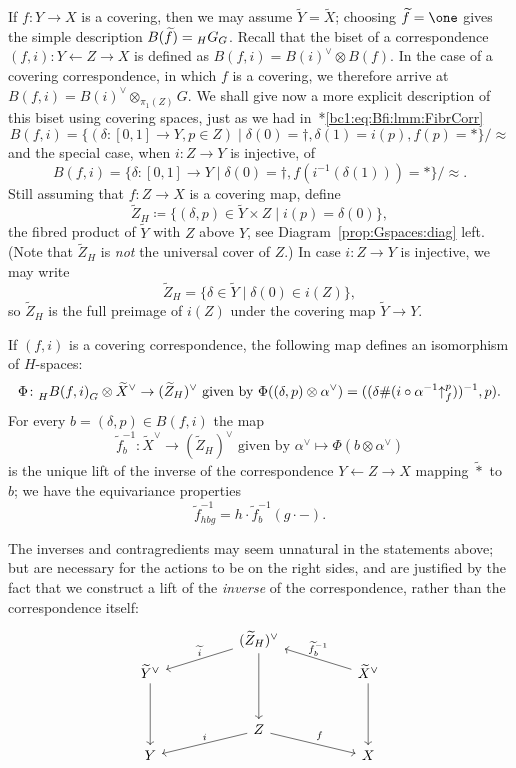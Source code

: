\documentclass{amsart}
\newcommand\wtf{{\widetilde f}}
\begin{document}
If $f\colon Y\to X$ is a covering, then we may assume
$\widetilde Y=\widetilde X$; choosing $\wtf=\one$ gives the
simple description $B(\wtf)=\subscript H G_G$. Recall that the
biset of a correspondence $(f,i)\colon Y\leftarrow Z\to X$ is defined
as $B(f,i)=B(i)^\vee\otimes B(f)$. In the case of a covering
correspondence, in which $f$ is a covering, we therefore arrive at
$B(f,i)=B(i)^\vee\otimes_{\pi_1(Z)}G$. We shall give now a more
explicit description of this biset using covering spaces, just as we
had in~\cite{bartholdi-dudko:bc1}*{\eqref{bc1:eq:Bfi:lmm:FibrCorr}}
\[B(f,i)=\{(\delta\colon[0,1]\to Y,p\in Z)\mid\delta(0)=\dagger,\delta(1)=i(p),f(p)=*\}/{\approx}\]
and the special case, when $i\colon Z\to Y$ is injective, of
\[B(f,i)=\{\delta\colon[0,1]\to Y\mid\delta(0)=\dagger,f(i^{-1}(\delta(1)))=*\}/{\approx}.\]
Still assuming that $f\colon Z\to X$ is a covering map, define
\begin{equation}\label{eq:ZH}
  \widetilde Z_H\coloneqq\{(\delta,p)\in\widetilde Y\times Z\mid i(p)=\delta(0)\},
\end{equation}
the fibred product of $\widetilde Y$ with $Z$ above $Y$, see
Diagram~\eqref{prop:Gspaces:diag} left. (Note that $\widetilde Z_H$ is
\emph{not} the universal cover of $Z$.) In case $i\colon Z\to Y$ is
injective, we may write
\[\widetilde Z_H=\{\delta\in\widetilde Y\mid\delta(0)\in i(Z)\},
\]
so $\widetilde Z_H$ is the full preimage of $i(Z)$ under the
covering map $\widetilde Y\to Y$.
\begin{prop}\label{prop:Gspaces}
  If $(f,i)$ is a covering correspondence, the following map defines
  an isomorphism of $H$-spaces:
  \[\Phi\colon\subscript H{B(f,i)}_G \otimes \widetilde X^\vee\to(\widetilde Z_H)^\vee\text{ given by }\Phi((\delta,p)\otimes\alpha^\vee)=((\delta\#(i\circ\alpha^{-1}\lift f p))^{-1},p).\]
  For every $b=(\delta,p)\in B(f,i)$ the map
  \[\wtf^{-1}_b\colon \widetilde X^\vee\to(\widetilde Z_H)^\vee\text{ given by }\alpha^\vee\mapsto\Phi(b\otimes\alpha^\vee)
  \]
  is the unique lift of the inverse of the correspondence
  $Y\leftarrow Z\to X$ mapping $\widetilde *$ to $b$; we have the
  equivariance properties
  \begin{equation}\label{eq:propGspaces}
    \wtf^{-1}_{h b g}=h\cdot\wtf^{-1}_b(g\cdot{-}).
  \end{equation}
\end{prop}
The inverses and contragredients may seem unnatural in the statements
above; but are necessary for the actions to be on the right sides, and
are justified by the fact that we construct a lift of the
\emph{inverse} of the correspondence, rather than the correspondence
itself:
\begin{equation}\label{prop:Gspaces:diag}
  \begin{tikzcd}[column sep=huge,row sep=tiny]
    & (\widetilde Z_H)^\vee\arrow[dl,"\widetilde i"{above}]\arrow[dd]\\
    \widetilde Y^\vee\arrow[dd] & & \widetilde X^\vee\arrow[dd]\arrow[ul,"\wtf_b^{-1}"{above}]\\[5ex]
    & Z\arrow[dl,"i"{above}]\arrow[dr,"f"]\\
    Y & & X
  \end{tikzcd}
\end{equation}
\end{document}
